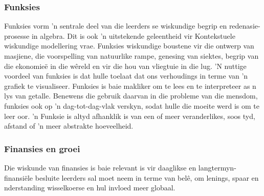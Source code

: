 \subsubsection{Funksies}
Funksies vorm 'n sentrale deel van die leerders se wiskundige begrip en redenasie-prosesse in algebra. Dit is ook 'n uitstekende geleentheid vir Kontekstuele wiskundige modellering vrae. Funksies wiskundige boustene vir die ontwerp van masjiene, die voorspelling van natuurlike rampe, genesing van siektes, begrip van die ekonomie\"{e} in die w\^{e}reld en vir die hou van vliegtuie in die lug. 'N nuttige voordeel van funksies is dat hulle toelaat dat ons verhoudings in terme van 'n grafiek te visualiseer. Funksies is baie makliker om te lees en te interpreteer as n lys van getalle. Benewens die gebruik daarvan in die probleme van die mensdom, funksies ook op 'n dag-tot-dag-vlak verskyn, sodat hulle die moeite werd is om te leer oor. 'n Funksie is altyd afhanklik is van een of meer veranderlikes, soos tyd, afstand of 'n meer abstrakte hoeveelheid.

\subsubsection{Finansies en groei}
Die wiskunde van finansies is baie relevant is vir daaglikse en langtermyn-finansi\"{e}le besluite leerders sal moet neem in terme van bel\^{e}, om lenings, spaar en nderstanding wisselkoerse en hul invloed meer globaal.

